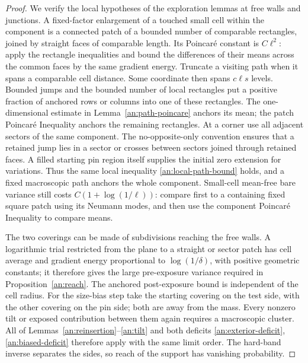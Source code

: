 \begin{proof}
We verify the local hypotheses of the exploration
lemmas at free walls and junctions.  A fixed-factor
enlargement of a touched small cell within the
component is a connected patch of a bounded number
of comparable rectangles, joined by straight
faces of comparable length.  Its Poincar\'e
constant is $C\ell^2$: apply the rectangle
inequalities and bound the differences of their
means across the common faces by the same
gradient energy.  Truncate a visiting path when
it spans a comparable cell distance.  Some
coordinate then spans $c\ell s$ levels.  Bounded
jumps and the bounded number of local rectangles
put a positive fraction of anchored rows or
columns into one of these rectangles.  The
one-dimensional estimate in
Lemma~\ref{an:path-poincare} anchors its mean;
the patch Poincar\'e Inequality anchors the
remaining rectangles.  At a corner use all
adjacent sectors of the same component.  The
no-opposite-only convention ensures that a
retained jump lies in a sector or crosses between
sectors joined through retained faces.  A filled
starting pin region itself supplies the initial
zero extension for variations.  Thus the same
local inequality \eqref{an:local-path-bound}
holds, and a fixed macroscopic path anchors the
whole component.  Small-cell mean-free bare
variance still costs $C(1+\log(1/\ell))$:
compare first to a containing fixed square patch
using its Neumann modes, and then use the
component Poincar\'e Inequality to compare means.

The two coverings can be made of subdivisions
reaching the free walls.  A logarithmic trial
restricted from the plane to a straight or
sector patch has cell average and gradient
energy proportional to $\log(1/\delta)$, with
positive geometric constants; it therefore
gives the large pre-exposure variance required
in Proposition~\ref{an:reach}.  The anchored
post-exposure bound is independent of the cell
radius.  For the size-bias step take the
starting covering on the test side, with the
other covering on the pin side; both are away
from the mass.  Every nonzero tilt or exposed
contribution between them again requires a
macroscopic cluster.  All of
Lemmas~\ref{an:reinsertion}--\ref{an:tilt} and
both deficits \eqref{an:exterior-deficit},
\eqref{an:biased-deficit} therefore apply with
the same limit order.  The hard-band inverse
separates the sides, so reach of the support
has vanishing probability.


\end{proof}
